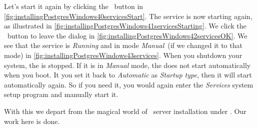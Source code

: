 Let's start it again by clicking the ~button in \cref{fig:installingPostgresWindows40servicesStart}.
The service is now starting again, as illustrated in \cref{fig:installingPostgresWindows41servicesStarting}.
We click the ~button to leave the dialog in \cref{fig:installingPostgresWindows42servicesOK}.
We see that the service is \emph{Running} and in mode \emph{Manual}~(if we changed it to that mode) in \cref{fig:installingPostgresWindows43services}.
When you shutdown your system, the  is stopped.
If it is in \emph{Manual} mode, the  does not start automatically when you boot.
It you set it back to \emph{Automatic} as \emph{Startup type}, then it will start automatically again.
So if you need it, you would again enter the \emph{Services} system setup program and manually start it.

With this we depart from the magical world of \postgresql\ server installation under \microsoftWindows.
Our work here is done.%
\FloatBarrier%
\endhsection%
%
